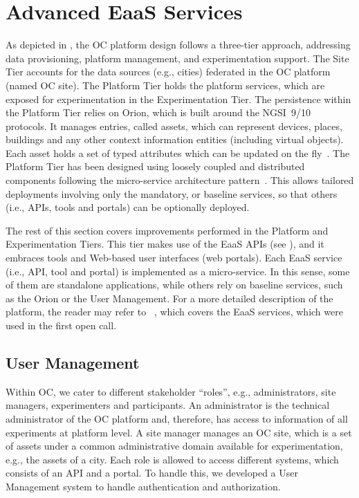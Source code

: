 
\section{Advanced EaaS Services}
\label{sec:adv}

As depicted in , the OC platform design follows a three-tier approach, addressing data provisioning, platform management, and experimentation support. The Site Tier accounts for the data sources (e.g., cities) federated in the OC platform (named OC site). The Platform Tier holds the platform services, which are exposed for experimentation in the Experimentation Tier. The persistence within the Platform Tier relies on Orion, which is  built around the NGSI~9/10 protocols. It manages entries, called assets, which can represent devices, places, buildings and any other context information entities (including virtual objects). Each asset holds a set of typed attributes which can be updated on the fly~\cite{gutierrez1}. The Platform Tier has been designed using loosely coupled and distributed components following the micro-service architecture pattern~\cite{newman2015building}. This allows tailored deployments involving only the mandatory, or baseline services, so that others (i.e., APIs, tools and portals) can be optionally deployed.

The rest of this section covers improvements performed in the Platform and Experimentation Tiers. This tier makes use of the EaaS APIs (see ), and it embraces tools and Web-based user interfaces (web portals). Each EaaS service (i.e., API, tool and portal) is implemented as a micro-service. In this sense, some of them are standalone applications, while others rely on baseline services, such as the Orion or the User Management. For a more detailed description of the platform, the reader may refer to ~\cite{gutierrez1}, which covers the EaaS services, which were used in the first open call. 

\subsection{User Management}

Within OC, we cater to different stakeholder ``roles'', e.g., administrators, site managers, experimenters and participants. An administrator is the technical administrator of the OC platform and, therefore, has access to information of all experiments at platform level. A site manager manages an OC site, which is a set of assets under a common administrative domain available for experimentation, e.g., the assets of a city. Each role is allowed to access different systems, which consists of an API and a portal. To handle this, we developed a User Management system to handle authentication and authorization.

